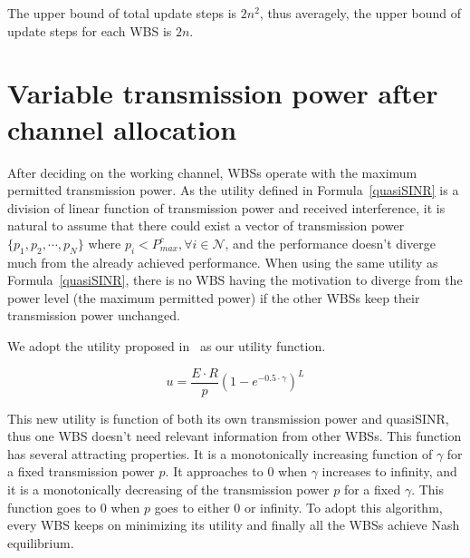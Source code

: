 The upper bound of total update steps is $2n^2$, thus averagely, the upper bound of update steps for each WBS is $2n$.



\section{Variable transmission power after channel allocation}
\label{powerAllocation}
After deciding on the working channel, WBSs operate with the maximum permitted transmission power.
As the utility defined in Formula~\ref{quasiSINR} is a division of linear function of transmission power and received interference, it is natural to assume that there could exist a vector of transmission power $\{p_1, p_2, \cdots, p_N\}$ where $p_i<P_{max}^c,\forall i\in \mathcal{N}$, and the performance doesn't diverge much from the already achieved performance.
When using the same utility as Formula~\ref{quasiSINR}, there is no WBS having the motivation to diverge from the power level (the maximum permitted power) if the other WBSs keep their transmission power unchanged.

We adopt the utility proposed in~\cite{power_control_utility_98} as our utility function.

\[u= \dfrac{E\cdot R}{p}(1-e^{-0.5\cdot \gamma})^L\]

This new utility is function of both its own transmission power and quasiSINR, thus one WBS doesn't need relevant information from other WBSs. 
This function has several attracting properties.
It is a monotonically increasing function of $\gamma$ for a fixed transmission power $p$.
It approaches to 0 when $\gamma$ increases to infinity, and it is a monotonically decreasing of the transmission power $p$ for a fixed $\gamma$.
This function goes to 0 when $p$ goes to either 0 or infinity.
To adopt this algorithm, every WBS keeps on minimizing its utility and finally all the WBSs achieve Nash equilibrium.
 






